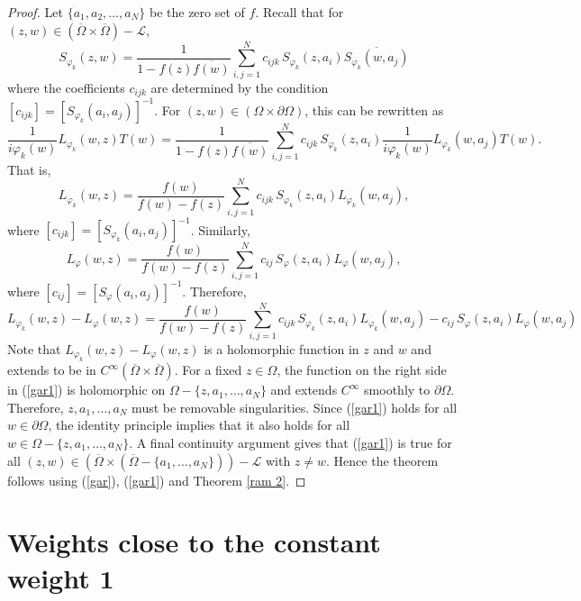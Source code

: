 \documentclass[11pt, reqno]{amsart}
\numberwithin{equation}{section}
\begin{document}
\begin{proof}
Let $\{a_1,a_2,\ldots,a_N\}$ be the zero set of $f$. Recall that for $(z,w)\in(\overline{\Omega}\times\overline{\Omega})- \mathcal{L}$,
\[
S_{\varphi_k}(z,w) = \frac{1}{1-f(z)\overline{f(w)}} \sum_{i,j=1}^N c_{ijk}\, S_{\varphi_k}(z,a_i) \overline{S_{\varphi_k}(w,a_j)} 
\]
where the coefficients $c_{ijk}$ are determined by the condition $[c_{ijk}]=[S_{\varphi_k}(a_i,a_j)]^{-1}$. For $(z,w)\in (\Omega \times \partial\Omega)$, this can be rewritten as
\[
\frac{1}{i\varphi_k(w)}L_{\varphi_k}(w,z)T(w) = \frac{1}{1-f(z)\overline{f(w)}} \sum_{i,j=1}^N c_{ijk}\, S_{\varphi_k}(z,a_i) \frac{1}{i\varphi_k(w)} L_{\varphi_k}(w,a_j) T(w).
\]
That is,
\begin{equation}
L_{\varphi_k}(w,z) = \frac{f(w)}{f(w)-f(z)} \sum_{i,j=1}^N c_{ijk}\, S_{\varphi_k}(z,a_i) L_{\varphi_k}(w,a_j), 
\end{equation}
where $[c_{ijk}]=[S_{\varphi_k}(a_i,a_j)]^{-1}$. Similarly,
\[
L_{\varphi}(w,z) = \frac{f(w)}{f(w)-f(z)} \sum_{i,j=1}^N c_{ij}\, S_{\varphi}(z,a_i) L_{\varphi}(w,a_j),
\]
where $[c_{ij}]=[S_{\varphi}(a_i,a_j)]^{-1}$. Therefore,
\begin{equation}\label{gar1}
L_{\varphi_k}(w,z) - L_{\varphi}(w,z) = \frac{f(w)}{f(w)-f(z)}
\sum_{i,j=1}^N 
c_{ijk}\, S_{\varphi_k}(z,a_i) L_{\varphi_k}(w,a_j) 
- 
c_{ij}\, S_{\varphi}(z,a_i) L_{\varphi}(w,a_j)
\end{equation}
Note that $L_{\varphi_k}(w,z) - L_{\varphi}(w,z)$ is a holomorphic function in $z$ and $w$ and extends to be in $C^{\infty}(\overline{\Omega}\times \overline{\Omega})$. For a fixed $z\in\Omega$, the function on the right side in (\ref{gar1}) is holomorphic on $\Omega - \{z,a_1,\ldots,a_N\}$ and extends $C^{\infty}$ smoothly to $\partial\Omega$. Therefore, $z,a_1,\ldots,a_N$ must be removable singularities. Since (\ref{gar1}) holds for all $w\in\partial\Omega$, the identity principle implies that it also holds for all $w\in \Omega - \{z,a_1,\ldots,a_N\}$. A final continuity argument gives that (\ref{gar1}) is true for all $(z,w)\in (\overline{\Omega}\times (\overline{\Omega}-\{a_1,\ldots,a_N\}))-\mathcal{L}$ with $z\neq w$. Hence the theorem follows using (\ref{gar}), (\ref{gar1}) and Theorem \ref{ram 2}.
\end{proof}

\section{Weights close to the constant weight $\mathbf{1}$}\label{weights_constant}
\end{document}
